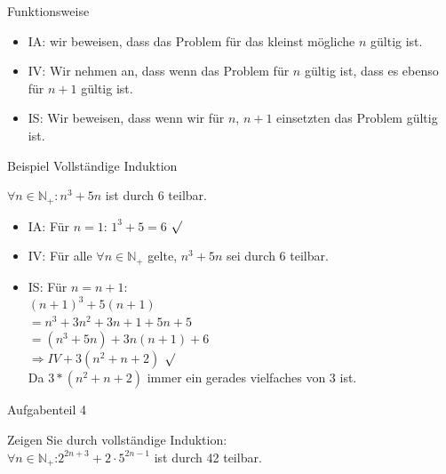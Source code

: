 \documentclass[18pt]{beamer}
\begin{document}
	\begin{frame} {Funktionsweise}
		\begin{itemize}
			\item IA: wir beweisen, dass das Problem f\"ur das kleinst m\"ogliche $n$ g\"ultig ist.
			\pause
			\item IV: Wir nehmen an, dass wenn das Problem f\"ur $n$ g\"ultig ist, dass es ebenso f\"ur $n+1$ g\"ultig ist.
			\pause
			\item IS: Wir beweisen, dass wenn wir f\"ur $n$, $n+1$ einsetzten das Problem g\"ultig ist.
		\end{itemize}
	\end{frame}
	
	
	\begin{frame} {Beispiel Vollst\"andige Induktion}
		\begin{block}{}
			$\forall n \in \mathbb{N}_+ : n^3 + 5n$ ist durch 6 teilbar.
		\end{block}
		
		\begin{block}{}
			\begin{itemize}
				\item IA: F\"ur $n = 1$: $1^3 + 5 = 6$ $\surd$
				\pause
				\item IV: F\"ur alle $\forall n \in \mathbb{N}_+$ gelte, $n^3 + 5n$ sei durch 6 teilbar.
				\pause
				\item IS: F\"ur $n = n+1$: \\
				 $(n+1)^3 + 5(n+1)$\\
				\pause
				 $=n^3 + 3n^2 + 3n + 1 + 5n + 5$\\
				\pause
				 $=(n^3 + 5n) + 3n(n+1) + 6$\\
				\pause
				 $\Rightarrow IV + 3(n^2+n+2)$ $\surd$\\
				 Da $3*(n^2+n+2)$ immer ein gerades vielfaches von 3 ist.
			\end{itemize}
		\end{block}
	\end{frame}
	
	
	\begin{frame} {Aufgabenteil 4}
		\begin{block} {}
			Zeigen Sie durch vollst\"andige Induktion:\\
			\vspace{10pt}
			$\forall n \in \mathbb{N}_+$:$2^{2n+3}+2\cdot5^{2n-1}$ ist durch 42 teilbar.
		\end{block}
	\end{frame}
	
\end{document}
